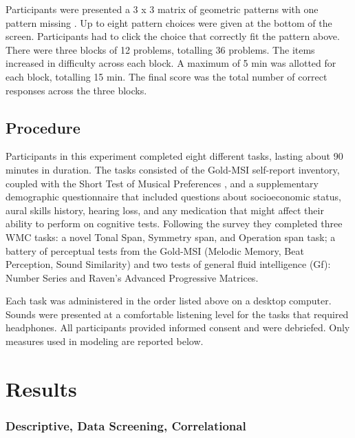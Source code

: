 \documentclass[12pt,]{book}
\begin{document}
Participants were presented a 3 x 3 matrix of geometric patterns with one pattern missing \citep{ravenManualRavenProgressive1994}. Up to eight pattern choices were given at the bottom of the screen.
Participants had to click the choice that correctly fit the pattern above.
There were three blocks of 12 problems, totalling 36 problems.
The items increased in difficulty across each block.
A maximum of 5 min was allotted for each block, totalling 15 min.
The final score was the total number of correct responses across the three blocks.

\hypertarget{procedure}{%
\subsection{Procedure}\label{procedure}}

Participants in this experiment completed eight different tasks, lasting about 90 minutes in duration.
The tasks consisted of the Gold-MSI self-report inventory, coupled with the Short Test of Musical Preferences \citep{rentfrowReMiEveryday2003}, and a supplementary demographic questionnaire that included questions about socioeconomic status, aural skills history, hearing loss, and any medication that might affect their ability to perform on cognitive tests.
Following the survey they completed three WMC tasks: a novel Tonal Span, Symmetry span, and Operation span task; a battery of perceptual tests from the Gold-MSI (Melodic Memory, Beat Perception, Sound Similarity) and two tests of general fluid intelligence (Gf): Number Series and Raven's Advanced Progressive Matrices.

Each task was administered in the order listed above on a desktop computer.
Sounds were presented at a comfortable listening level for the tasks that required headphones.
All participants provided informed consent and were debriefed.
Only measures used in modeling are reported below.

\hypertarget{results}{%
\section{Results}\label{results}}

\hypertarget{descriptive-data-screening-correlational}{%
\subsubsection{Descriptive, Data Screening, Correlational}\label{descriptive-data-screening-correlational}}
\end{document}
